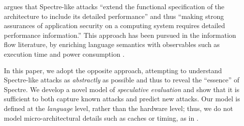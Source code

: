 \citet{Chien:2018} argues that Spectre-like attacks ``extend the functional
specification of the architecture to include its detailed performance'' and
thus ``making strong assurances of application security on a computing system
requires detailed performance information.''
This approach has been pursued in the information flow literature, by
enriching language semantics with observables such as execution time and  power consumption
\cite{Zhang:2012:LCM:2345156.2254078,hyperflow}.

In this paper, we adopt the opposite approach, attempting to understand
Spectre-like attacks as \emph{abstractly} as possible and thus to reveal the
``essence'' of Spectre.  We develop a novel model of \emph{speculative
  evaluation} and show that it is sufficient to both capture known attacks and
predict new attacks.  Our model is defined at the \emph{language} level,
rather than the hardware level; thus, we do not model micro-architectural
details such as caches or timing, as in
\cite{Zhang:2012:LCM:2345156.2254078,hyperflow}.


